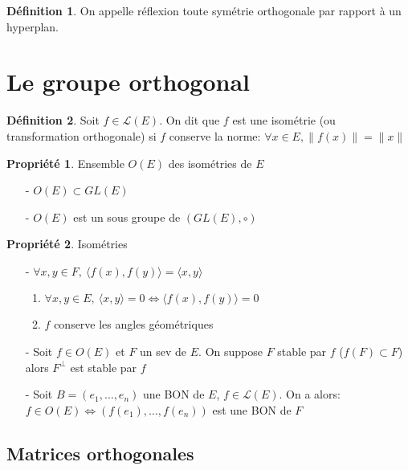\documentclass[fleqn]{article}
\theoremstyle{definition} \newtheorem*{defi}{D\'efinition}
\theoremstyle{definition} \newtheorem*{theo}{Th\'eor\`eme}
\theoremstyle{definition} \newtheorem*{coro}{Corollaire}
\theoremstyle{remark} \newtheorem*{rqs}{Remarques}
\theoremstyle{definition} \newtheorem*{prop}{Propri\'et\'e}
\begin{document}
\begin{defi}
	On appelle r\'eflexion toute sym\'etrie orthogonale par rapport \`a un hyperplan.
\end{defi}

\section{Le groupe orthogonal}

\begin{defi}
	Soit $f \in \mathscr{L}(E)$. On dit que $f$ est une isom\'etrie (ou transformation orthogonale) si $f$ conserve la norme: $\forall x \in E,
	\|f(x)\| = \|x\|$
\end{defi}

\begin{prop} Ensemble $O(E)$ des isom\'etries de $E$
	\begin{enumerate}
		\item [-] $O(E) \subset GL(E)$
		\item [-] $O(E)$ est un sous groupe de $(GL(E),\circ)$
	\end{enumerate}
\end{prop}

\begin{prop} Isom\'etries
	\begin{enumerate}
		\item [-] $\forall x,y \in F,\ \langle f(x), f(y) \rangle = \langle x,y \rangle$
			\begin{enumerate}
				\item $\forall x,y \in E,\ \langle x,y \rangle = 0 \Leftrightarrow \langle f(x), f(y) \rangle = 0$
				\item $f$ conserve les angles g\'eom\'etriques
			\end{enumerate}
		\item [-] Soit $f \in O(E)$ et $F$ un sev de $E$. On suppose $F$ stable par $f$ ($f(F) \subset F$) alors $F^\perp$ est stable par $f$
		\item [-] Soit $B = (e_1, \hdots, e_n)$ une BON de $E$, $f \in \mathscr{L}(E)$. On a alors:\\
			$f \in O(E) \Leftrightarrow (f(e_1), \hdots, f(e_n))$ est une BON de $F$
	\end{enumerate}
\end{prop}

\subsection{Matrices orthogonales}
\end{document}
